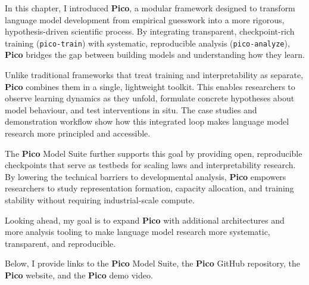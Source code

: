 

In this chapter, I introduced \textbf{Pico}, a modular framework designed to transform language model development from empirical guesswork into a more rigorous, hypothesis-driven scientific process. By integrating transparent, checkpoint-rich training (\texttt{pico-train}) with systematic, reproducible analysis (\texttt{pico-analyze}), \textbf{Pico} bridges the gap between building models and understanding how they learn.

Unlike traditional frameworks that treat training and interpretability as separate, \textbf{Pico} combines them in a single, lightweight toolkit. This enables researchers to observe learning dynamics as they unfold, formulate concrete hypotheses about model behaviour, and test interventions in situ. The case studies and demonstration workflow show how this integrated loop makes language model research more principled and accessible.

The \textbf{Pico} Model Suite further supports this goal by providing open, reproducible checkpoints that serve as testbeds for scaling laws and interpretability research. By lowering the technical barriers to developmental analysis, \textbf{Pico} empowers researchers to study representation formation, capacity allocation, and training stability without requiring industrial-scale compute.

Looking ahead, my goal is to expand \textbf{Pico} with additional architectures and more analysis tooling to make language model research more systematic, transparent, and reproducible.


\vspace{1em}
Below, I provide links to the \textbf{Pico} Model Suite, the \textbf{Pico} GitHub repository, the \textbf{Pico} website, and the \textbf{Pico} demo video.

